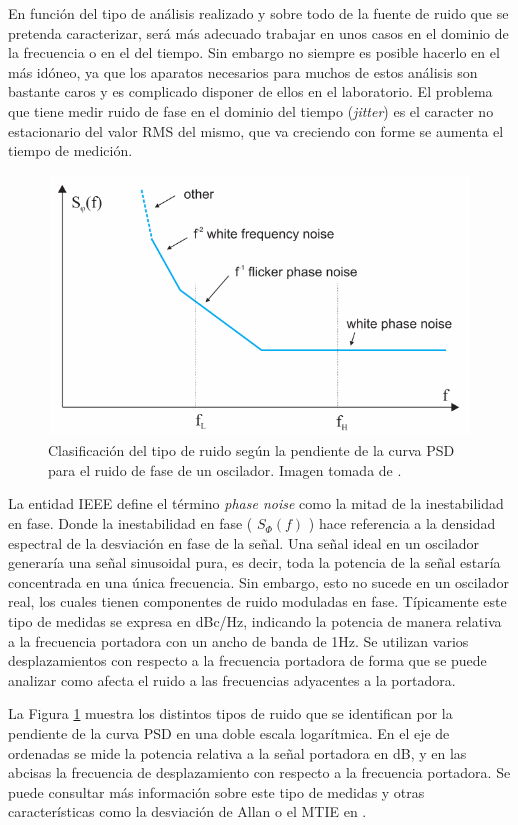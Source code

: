 En función del tipo de análisis realizado y sobre todo de 
la fuente de ruido que se pretenda caracterizar, será más adecuado trabajar en 
unos casos en el dominio de la frecuencia o en el del tiempo. Sin embargo no 
siempre es posible hacerlo en el más idóneo, ya que los aparatos necesarios 
para muchos de 
estos análisis son bastante caros y es complicado disponer de ellos en el 
laboratorio. El 
problema que tiene medir ruido de fase en el dominio del tiempo 
(\textit{jitter}) es el caracter no estacionario del valor RMS del mismo, que 
va creciendo con forme se aumenta el tiempo de medición.

\begin{figure}
	\centering
	\includegraphics[width=0.7\linewidth]{imagenes/psd_noise}
	\caption[Tipos de ruido en la curva PSD para un XO.]{Clasificación del tipo 
	de ruido según la pendiente de la curva PSD para el ruido de fase de un 
	oscilador. Imagen tomada de \cite{Wlostowski2011}.}
	\label{fig:psdnoise}
\end{figure}

La entidad IEEE define el término \textit{phase noise} \cite{ieeephysdefs} como 
la mitad 
de la inestabilidad en fase. Donde la inestabilidad en fase ( $S_{\Phi} (f)$ ) 
hace referencia a la densidad espectral de la desviación en fase de la señal. 
Una señal ideal en un oscilador generaría una señal sinusoidal pura, es decir, 
toda la potencia de la señal estaría concentrada en una única frecuencia. Sin 
embargo, esto no sucede en un oscilador real, los cuales tienen componentes de 
ruido moduladas en fase. Típicamente este tipo de medidas se expresa en dBc/Hz, 
indicando la potencia de manera relativa a la frecuencia portadora con un ancho 
de banda de 1Hz. Se utilizan varios desplazamientos con respecto a la 
frecuencia portadora de forma que se puede analizar como afecta el ruido a las 
frecuencias adyacentes a la portadora.

La Figura \ref{fig:psdnoise} muestra los distintos tipos de ruido que se 
identifican por la pendiente de la curva PSD en una doble escala logarítmica. 
En el eje de ordenadas se mide la potencia relativa a la señal portadora en dB, 
y en las abcisas la frecuencia de desplazamiento con respecto a la frecuencia 
portadora. Se puede consultar más información sobre este tipo de medidas y 
otras características como la desviación de Allan o el MTIE en \cite{Riley1994}.

